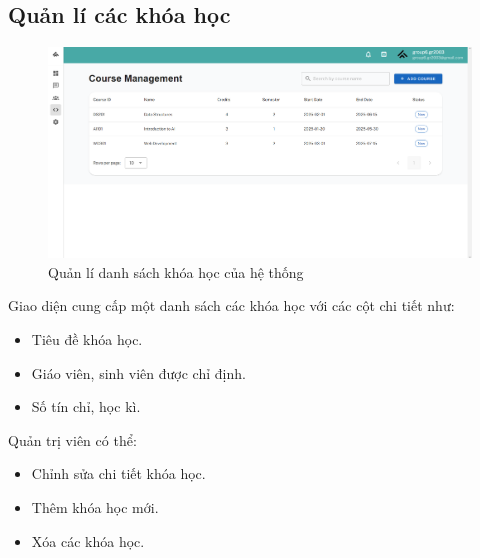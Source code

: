 \subsection{Quản lí các khóa học}
\begin{figure}[H]
    \centering
    \includegraphics[width=0.8\linewidth]{images/admin_course_management.png}
    \caption{Quản lí danh sách khóa học của hệ thống}
    \label{fig:enter-label}
\end{figure}
Giao diện cung cấp một danh sách các khóa học với các cột chi tiết như:
\begin{itemize}
    \item Tiêu đề khóa học.
    \item Giáo viên, sinh viên được chỉ định.
    \item Số tín chỉ, học kì.
\end{itemize}

Quản trị viên có thể:
\begin{itemize}
    \item Chỉnh sửa chi tiết khóa học.
    \item Thêm khóa học mới.
    \item Xóa các khóa học.
\end{itemize}


